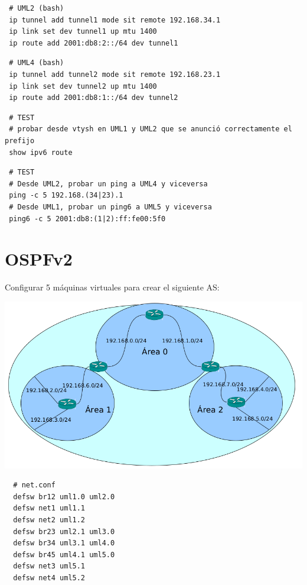 \documentclass{article}
\begin{document}
\begin{verbatim}
 # UML2 (bash)
 ip tunnel add tunnel1 mode sit remote 192.168.34.1
 ip link set dev tunnel1 up mtu 1400
 ip route add 2001:db8:2::/64 dev tunnel1
\end{verbatim}

\begin{verbatim}
 # UML4 (bash)
 ip tunnel add tunnel2 mode sit remote 192.168.23.1
 ip link set dev tunnel2 up mtu 1400
 ip route add 2001:db8:1::/64 dev tunnel2
\end{verbatim}

\begin{verbatim}
 # TEST
 # probar desde vtysh en UML1 y UML2 que se anunció correctamente el prefijo
 show ipv6 route
\end{verbatim}

\begin{verbatim}
 # TEST
 # Desde UML2, probar un ping a UML4 y viceversa
 ping -c 5 192.168.(34|23).1
 # Desde UML1, probar un ping6 a UML5 y viceversa
 ping6 -c 5 2001:db8:(1|2):ff:fe00:5f0
\end{verbatim}


\section{OSPFv2}

Configurar 5 máquinas virtuales para crear el siguiente AS:

\includegraphics[width=\textwidth]{ospfv2}

\begin{verbatim}
  # net.conf
  defsw br12 uml1.0 uml2.0
  defsw net1 uml1.1
  defsw net2 uml1.2
  defsw br23 uml2.1 uml3.0
  defsw br34 uml3.1 uml4.0
  defsw br45 uml4.1 uml5.0
  defsw net3 uml5.1
  defsw net4 uml5.2 
\end{verbatim}
\end{document}
